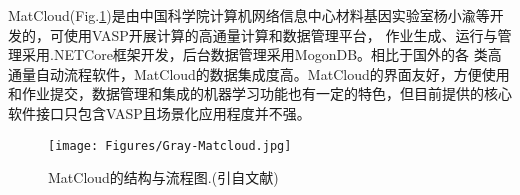 \textrm{MatCloud}(\textrm{Fig.}\ref{Auto_Flow_Platform-6})是由中国科学院计算机网络信息中心材料基因实验室杨小渝等开发的，可使用\textrm{VASP}开展计算的高通量计算和数据管理平台，%
作业生成、运行与管理采用\textrm{.NETCore}框架开发，后台数据管理采用\textrm{MogonDB}。相比于国外的各 类高通量自动流程软件，\textrm{MatCloud}的数据集成度高。\textrm{MatCloud}的界面友好，方便使用和作业提交，数据管理和集成的机器学习功能也有一定的特色，但目前提供的核心软件接口只包含\textrm{VASP}且场景化应用程度并不强。

\begin{figure}[h!]
\centering
\texttt{[image: Figures/Gray-Matcloud.jpg]}%
\caption{\textrm{MatCloud}的结构与流程图.(引自文献\cite{CMS146-319_2018})}
\label{Auto_Flow_Platform-6}
\end{figure}

